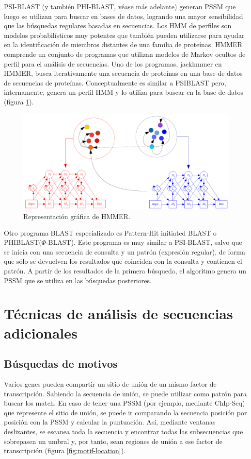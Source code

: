 PSI-BLAST (y también PHI-BLAST, véase más adelante) generan PSSM que luego se utilizan para buscar en bases de datos, logrando una mayor sensibilidad que las búsquedas regulares basadas en secuencias. Los HMM de perfiles son modelos probabilísticos muy potentes que también pueden utilizarse para ayudar en la identificación de miembros distantes de una familia de proteínas. HMMER comprende un conjunto de programas que utilizan modelos de Markov ocultos de perfil para el análisis de secuencias. Uno de los programas, jackhmmer en HMMER, busca iterativamente una secuencia de proteínas en una base de datos de secuencias de proteínas. Conceptualmente es similar a PSIBLAST pero, internamente, genera un perfil HMM y lo utiliza para buscar en la base de datos (figura \ref{fig:hmmer}).

\begin{figure}[htbp]
\centering
\includegraphics[width = \textwidth]{figs/hmmer.png}
\caption{Representación gráfica de HMMER.}
\label{fig:hmmer}
\end{figure}

Otro programa BLAST especializado es Pattern-Hit initiated BLAST o PHIBLAST($\Phi$-BLAST). Este programa es muy similar a PSI-BLAST, salvo que se inicia con una secuencia de consulta y un patrón (expresión regular), de forma que sólo se devuelven los resultados que coinciden con la consulta y contienen el patrón. A partir de los resultados de la primera búsqueda, el algoritmo genera un PSSM que se utiliza en las búsquedas posteriores.

\section{Técnicas de análisis de secuencias adicionales}
\subsection{Búsquedas de motivos}
Varios genes pueden compartir un sitio de unión de un mismo factor de transcripción. Sabiendo la secuencia de unión, se puede utilizar como patrón para buscar los match. En caso de tener una PSSM (por ejemplo, mediante ChIp-Seq) que represente el sitio de unión, se puede ir comparando la secuencia posición por posición con la PSSM y calcular la puntuación. Así, mediante ventanas deslizantes, se escanea toda la secuencia y encontrar todas las subsecuencias que sobrepasen un umbral y, por tanto, sean regiones de unión a ese factor de transcripción (figura \ref{fig:motif-location}). 

